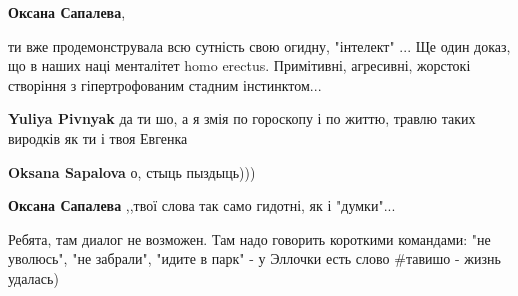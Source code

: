 \begin{itemize}
\begin{itemize}
 
\textbf{Оксана Сапалева},

ти вже продемонструвала всю сутність свою огидну, "інтелект" ... Ще один
доказ, що в наших наці менталітет homo erectus. Примітивні, агресивні, жорстокі
створіння з гіпертрофованим стадним інстинктом...


 
\textbf{Yuliya Pivnyak} да ти шо, а я змія по гороскопу і по життю, травлю таких виродків як ти і твоя Евгенка

 
\textbf{Oksana Sapalova} о, стыць пыздыць)))

 
\textbf{Оксана Сапалева} ,,твої слова так само гидотні, як і "думки"...

 

Ребята, там диалог не возможен. Там надо говорить короткими командами: "не
уволюсь", "не забрали", "идите в парк" - у Эллочки есть слово \#тавишо - жизнь
удалась)


 

\end{itemize}
\end{itemize}
